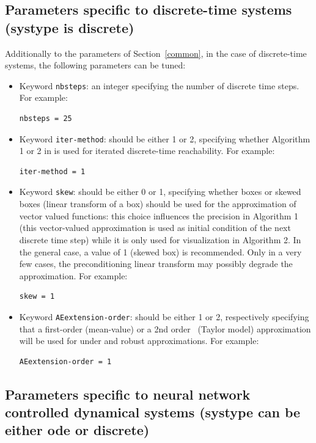 \documentclass{article}
\begin{document}
\subsection{Parameters specific to discrete-time systems (systype is discrete)}
Additionally to the parameters of Section~\ref{common}, in the case of discrete-time systems, the following parameters can be tuned:
\begin{itemize}
\item Keyword \texttt{nbsteps}: an integer specifying the number of discrete time steps.
For example:
\begin{verbatim}
nbsteps = 25
\end{verbatim}
\item Keyword \texttt{iter-method}: should be either 1 or 2,  specifying whether Algorithm 1 or 2 in \cite{adhs21} is used for iterated discrete-time reachability.  
For example:
\begin{verbatim}
iter-method = 1
\end{verbatim}
\item Keyword \texttt{skew}: should be either 0 or 1, specifying whether boxes or skewed boxes (linear transform of a box) should be used for the approximation of vector valued functions: this choice influences the precision in Algorithm 1 (this vector-valued approximation is used as initial condition of the next discrete time step) while it is only used for visualization in Algorithm 2.
In the general case,  a value of 1 (skewed box) is recommended. Only in a very few  cases, the preconditioning linear transform may possibly degrade the approximation. 
For example:
\begin{verbatim}
skew = 1
\end{verbatim}
\item Keyword \texttt{AEextension-order}: should be either 1 or 2,  respectively specifying that a first-order (mean-value) or a 2nd order~\cite{adhs21} (Taylor model) approximation will be used for under and robust approximations. 
For example:
\begin{verbatim}
AEextension-order = 1
\end{verbatim}
\end{itemize}

\subsection{Parameters specific to neural network controlled dynamical systems (systype can be either ode or discrete)}
\end{document}
